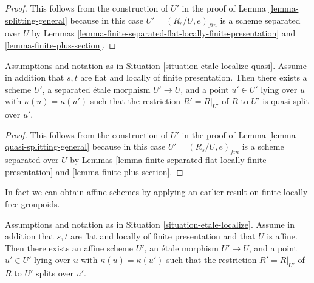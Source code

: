 \begin{proof}
This follows from the construction of $U'$ in the proof of
Lemma \ref{lemma-splitting-general}
because in this case $U' = (R_s/U, e)_{fin}$ is a scheme separated over
$U$ by
Lemmas \ref{lemma-finite-separated-flat-locally-finite-presentation} and
\ref{lemma-finite-plus-section}.
\end{proof}

\begin{lemma}
\label{lemma-quasi-splitting-scheme}
Assumptions and notation as in
Situation \ref{situation-etale-localize-quasi}.
Assume in addition that $s, t$ are flat and locally of finite presentation.
Then there exists a scheme $U'$, a separated \'etale morphism
$U' \to U$, and a point $u' \in U'$ lying over $u$ with
$\kappa(u) = \kappa(u')$ such that the restriction $R' = R|_{U'}$ of
$R$ to $U'$ is quasi-split over $u'$.
\end{lemma}

\begin{proof}
This follows from the construction of $U'$ in the proof of
Lemma \ref{lemma-quasi-splitting-general}
because in this case $U' = (R_s/U, e)_{fin}$ is a scheme separated
over $U$ by
Lemmas \ref{lemma-finite-separated-flat-locally-finite-presentation} and
\ref{lemma-finite-plus-section}.
\end{proof}

\noindent
In fact we can obtain affine schemes by applying an earlier result
on finite locally free groupoids.

\begin{lemma}
\label{lemma-splitting-affine-scheme}
Assumptions and notation as in
Situation \ref{situation-etale-localize}.
Assume in addition that $s, t$ are flat and locally of finite presentation
and that $U$ is affine.
Then there exists an affine scheme $U'$, an \'etale morphism
$U' \to U$, and a point $u' \in U'$ lying over $u$ with
$\kappa(u) = \kappa(u')$ such that the restriction $R' = R|_{U'}$ of
$R$ to $U'$ splits over $u'$.
\end{lemma}

